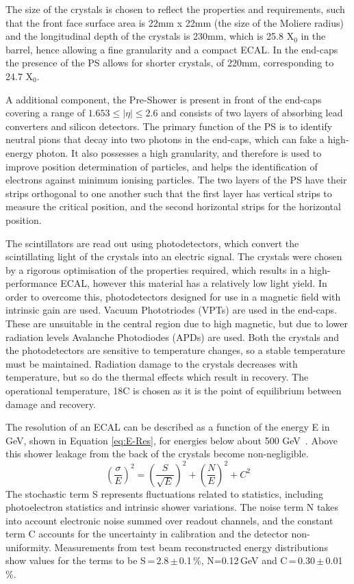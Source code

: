  The size of the crystals is chosen to reflect the properties and requirements, such that the front face surface area is 22mm x 22mm (the size of the Moliere radius) and the longitudinal depth of the crystals is 230mm, which is 25.8 X$_{0}$ in the barrel, hence allowing a fine granularity and a compact ECAL. In the end-caps the presence of the PS allows for shorter crystals, of 220mm, corresponding to 24.7 X$_{0}$.

A additional component, the Pre-Shower is present in front of the end-caps covering a range of $1.653\leq |\eta|\leq2.6$ and consists of two layers of absorbing lead converters and silicon detectors. The primary function of the PS is to identify neutral pions that decay into two photons in the end-caps, which can fake a high-energy photon. It also possesses a high granularity, and therefore is used to improve position determination of particles, and helps the identification of electrons against minimum ionising particles. The two layers of the PS have their strips orthogonal to one another such that the first layer has vertical strips to measure the critical position, and the second horizontal strips for the horizontal position. 

The scintillators are read out using photodetectors, which convert the scintillating light of the crystals into an electric signal. The crystals were chosen by a rigorous optimisation of the properties required, which results in a high-performance ECAL, however this material has a relatively low light yield. In order to overcome this, photodetectors designed for use in a magnetic field with intrinsic gain are used. Vacuum Phototriodes  (VPTs) are used in the end-caps. These are unsuitable in the central region due to high magnetic, but due to lower radiation levels Avalanche Photodiodes (APDs) are used. Both the crystals and the photodetectors are sensitive to temperature changes, so a stable temperature must be maintained. Radiation damage to the crystals decreases with temperature, but so do the thermal effects which result in recovery. The operational temperature, 18C is chosen as it is the point of equilibrium between damage and recovery.


The resolution of an ECAL can be described as a function of the energy E in GeV, shown in Equation \ref{eq:E-Res}, for energies below about 500 GeV~\cite{PDG}. Above this shower leakage from the back of the crystals become non-negligible. 
\begin{equation}
\left(\frac{\sigma}{E}\right)^2 = \left(\frac{S}{\sqrt{E}}\right)^2 + \left(\frac{N}{E}\right)^2 + C^2
\label{eq:E-Res}
\end{equation}
The stochastic term S represents fluctuations related to statistics, including photoelectron statistics and intrinsic shower variations. The noise term N takes into account electronic noise summed over readout channels, and the constant term C accounts for the uncertainty in calibration and the detector non-uniformity. Measurements from test beam reconstructed energy distributions show values for the terms to be S\,=\,2.8\,$\pm$\,0.1\,\%, N=0.12\,GeV and C\,=\,0.30\,$\pm$\,0.01\,\%. 


